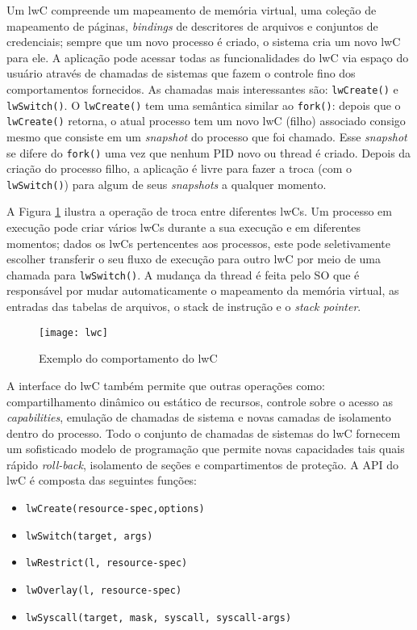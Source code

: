 Um lwC compreende um mapeamento de memória virtual, uma coleção de mapeamento
de páginas, \emph{bindings} de descritores de arquivos e conjuntos de
credenciais; sempre que um novo processo é criado, o sistema cria um novo lwC
para ele. A aplicação pode acessar todas as funcionalidades do lwC via espaço
do usuário através de chamadas de sistemas que fazem o controle fino dos
comportamentos fornecidos.  As chamadas mais interessantes são:
\texttt{lwCreate()} e \texttt{lwSwitch()}. O \texttt{lwCreate()} tem uma
semântica similar ao \texttt{fork()}: depois que o \texttt{lwCreate()} retorna,
o atual processo tem um novo lwC (filho) associado consigo mesmo que consiste
em um \emph{snapshot} do processo que foi chamado. Esse \emph{snapshot} se
difere do \texttt{fork()} uma vez que nenhum PID novo ou thread é criado.
Depois da criação do processo filho, a aplicação é livre para fazer a troca
(com o \texttt{lwSwitch()}) para algum de seus \emph{snapshots} a qualquer
momento.

A Figura \ref{fig:lwc} ilustra a operação de troca entre diferentes lwCs. Um
processo em execução pode criar vários lwCs durante a sua execução e em
diferentes momentos; dados os lwCs pertencentes aos processos, este pode
seletivamente escolher transferir o seu fluxo de execução para outro lwC por
meio de uma chamada para \texttt{lwSwitch()}. A mudança da thread é feita pelo
SO que é responsável por mudar automaticamente o mapeamento da memória virtual,
as entradas das tabelas de arquivos, o stack de instrução e o \emph{stack
pointer}.

\begin{figure}[!h]
  \centering
  \texttt{[image: lwc]} 
  \caption{Exemplo do comportamento do lwC}
  \label{fig:lwc} 
\end{figure}

A interface do lwC também permite que outras operações como: compartilhamento
dinâmico ou estático de recursos, controle sobre o acesso as
\emph{capabilities}, emulação de chamadas de sistema e novas camadas de
isolamento dentro do processo. Todo o conjunto de chamadas de sistemas do lwC
fornecem um sofisticado modelo de programação que permite novas capacidades
tais quais rápido \emph{roll-back}, isolamento de seções e compartimentos de
proteção. A API do lwC é composta das seguintes funções:

\begin{itemize}
  \item \texttt{lwCreate(resource-spec,options)}
  \item \texttt{lwSwitch(target, args)}
  \item \texttt{lwRestrict(l, resource-spec)}
  \item \texttt{lwOverlay(l, resource-spec)}
  \item \texttt{lwSyscall(target, mask, syscall, syscall-args)}
\end{itemize}

